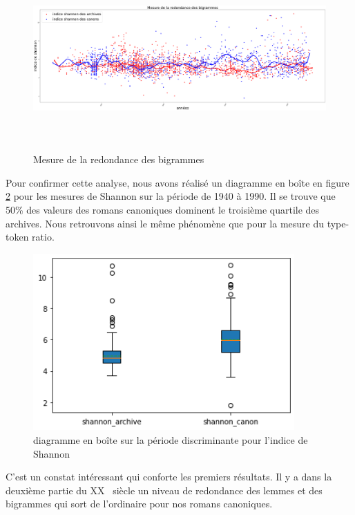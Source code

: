 \documentclass[a4paper,twoside,12pt]{book}
\begin{document}
\bigskip
\begin{figure}[!ht]
    \centering
    \includegraphics[width=15cm,height=7cm]{img/09_results_shannon_regression.png}
    \caption{Mesure de la redondance des bigrammes}
    \label{bigram_shannon}
\end{figure}

Pour confirmer cette analyse, nous avons réalisé un diagramme en boîte en figure \ref{boxplot_sha} pour les mesures de Shannon sur la période de 1940 à 1990. Il se trouve que 50\% des valeurs des romans canoniques dominent le troisième quartile des archives. Nous retrouvons ainsi le même phénomène que pour la mesure du type-token ratio.

\bigskip
\begin{figure}[!ht]
    \centering
    \includegraphics[width=10cm]{img/10_boxplot_shannon.png}
    \caption{diagramme en boîte sur la période discriminante pour l'indice de Shannon}
    \label{boxplot_sha}
\end{figure}

C'est un constat intéressant qui conforte les premiers résultats. Il y a dans la deuxième partie du XX\ieme~ siècle un niveau de redondance des lemmes et des bigrammes qui sort de l'ordinaire pour nos romans canoniques. 
\end{document}
